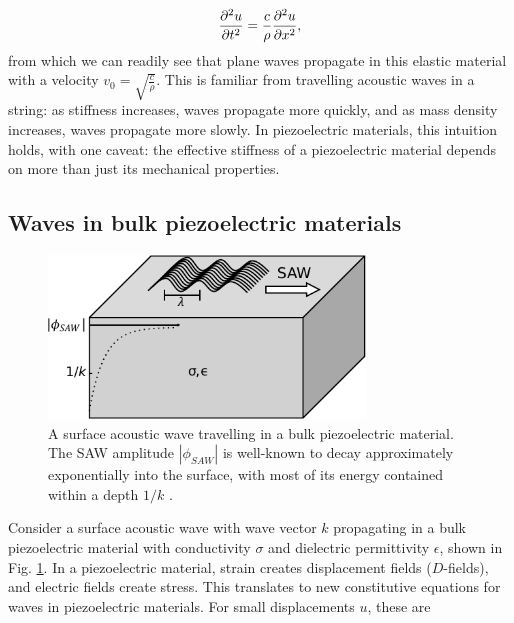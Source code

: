 \documentclass[double,12pt,1in]{beavtex}
\begin{document}
\begin{equation}
    \pdv[2]{u}{t} = \frac{c}{\rho} \pdv[2]{u}{x},
\end{equation}
from which we can readily see that plane waves propagate in this elastic material with a velocity $v_0 = \sqrt{\frac{c}{\rho}}$. This is familiar from travelling acoustic waves in a string: as stiffness increases, waves propagate more quickly, and as mass density increases, waves propagate more slowly. In piezoelectric materials, this intuition holds, with one caveat: the effective stiffness of a piezoelectric material depends on more than just its mechanical properties.

\subsection{Waves in bulk piezoelectric materials} \label{waves in bulk piezoelectric materials}
\begin{figure}
    \includegraphics[width=0.75\textwidth]{SAW in bulk semi.pdf}
    \caption{A surface acoustic wave travelling in a bulk piezoelectric material. The SAW amplitude $|\phi_{SAW}|$ is well-known to decay approximately exponentially into the surface, with most of its energy contained within a depth $1/k$ \cite{wixforth_surface_1989}.}
    \label{SAWbulksemi}
\end{figure}

Consider a surface acoustic wave with wave vector $k$ propagating in a bulk piezoelectric material with conductivity $\sigma$ and dielectric permittivity $\epsilon$, shown in Fig. \ref{SAWbulksemi}. In a piezoelectric material, strain creates displacement fields ($D$-fields), and electric fields create stress. This translates to new constitutive equations for waves in piezoelectric materials. For small displacements $u$, these are
\end{document}

